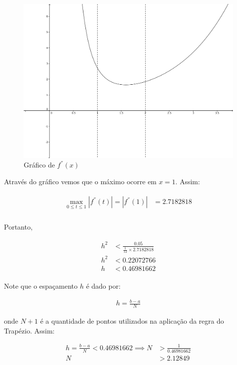 \documentclass[paper=a4, fontsize=12pt]{scrartcl}
\numberwithin{equation}{section} %
\numberwithin{figure}{section} %
\numberwithin{table}{section} %
\begin{document}
 		\begin{figure}[H]
 			\centering
 			\includegraphics[scale=0.25]{ex08.png}
 			\caption{Gráfico de $f^{''}(x)$}
 		\end{figure}

		Através do gráfico vemos que o máximo ocorre em $x = 1$. Assim:

		\begin{align*}
		\begin{split}
		\max_{0 \leq t \leq 1} |f^{''}(t)| = |f^{''} (1)| &= 2.7182818\\
		\end{split}
		\end{align*}

		Portanto,

		\begin{align*}
		\begin{split}
		h^2  	&< \frac{0.05}{\frac{1}{12} \times 2.7182818 } \\
		h^2 	&< 0.22072766 \\
		h 		&< 0.46981662
		\end{split}
		\end{align*}

		Note que o espaçamento $h$ é dado por:

        \begin{align*}
		h = \frac{b - a}{N}
		\end{align*}

		onde $N + 1$ é a quantidade de pontos utilizados na aplicação da regra do Trapézio. Assim:

		\begin{align*}
		h = \frac{b - a}{N} < 0.46981662\implies N &> \frac{1}{0.46981662} \\
		N &> 2.12849  \\
		\end{align*}
\end{document}
